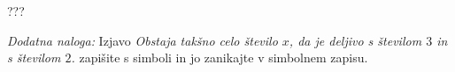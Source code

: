 \documentclass[addpoints,12pt]{exam}
\begin{document}
\begin{questions}
    \begin{solution}[11cm]
        ???
            \end{solution}



    
    \bonusquestion[3]
    \textit{Dodatna naloga:} Izjavo \textit{Obstaja takšno celo število $x$, da je deljivo s številom $3$ in s številom $2$.} zapišite s simboli in jo zanikajte v simbolnem zapisu.


\end{questions}
\end{document}
